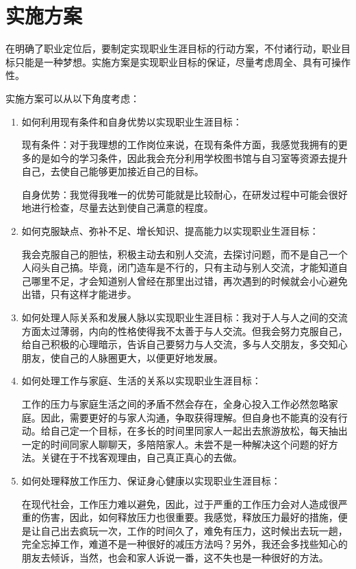 \documentclass{article}
\begin{document}
\section{实施方案}
在明确了职业定位后，要制定实现职业生涯目标的行动方案，不付诸行动，职业目标只能是一种梦想。实施方案是实现职业目标的保证，尽量考虑周全、具有可操作性。\par
实施方案可以从以下角度考虑：\par
\begin{enumerate}[1、]
	\item 如何利用现有条件和自身优势以实现职业生涯目标：\par 
	现有条件：对于我理想的工作岗位来说，在现有条件方面，我感觉我拥有的更多的是如今的学习条件，因此我会充分利用学校图书馆与自习室等资源去提升自己，去使自己能够更加接近自己的目标。\par 
	自身优势：我觉得我唯一的优势可能就是比较耐心，在研发过程中可能会很好地进行检查，尽量去达到使自己满意的程度。\par 
	\item 如何克服缺点、弥补不足、增长知识、提高能力以实现职业生涯目标：\par 
	我会克服自己的胆怯，积极主动去和别人交流，去探讨问题，而不是自己一个人闷头自己搞。毕竟，闭门造车是不行的，只有主动与别人交流，才能知道自己哪里不足，才会知道别人曾经在那里出过错，再次遇到的时候就会小心避免出错，只有这样才能进步。\par 
	\item 如何处理人际关系和发展人脉以实现职业生涯目标：我对于人与人之间的交流方面太过薄弱，内向的性格使得我不太善于与人交流。但我会努力克服自己，给自己积极的心理暗示，告诉自己要努力与人交流，多与人交朋友，多交知心朋友，使自己的人脉圈更大，以便更好地发展。\par 
	\item 如何处理工作与家庭、生活的关系以实现职业生涯目标：\par 
	工作的压力与家庭生活之间的矛盾不然会存在，全身心投入工作必然忽略家庭。因此，需要更好的与家人沟通，争取获得理解。但自身也不能真的没有行动。给自己定一个目标，在多长的时间里同家人一起出去旅游放松，每天抽出一定的时间同家人聊聊天，多陪陪家人。未尝不是一种解决这个问题的好方法。关键在于不找客观理由，自己真正真心的去做。\par 
	\item 如何处理释放工作压力、保证身心健康以实现职业生涯目标：\par 
	在现代社会，工作压力难以避免，因此，过于严重的工作压力会对人造成很严重的伤害，因此，如何释放压力也很重要。我感觉，释放压力最好的措施，便是让自己出去疯玩一次，工作的时间久了，难免有压力，这时候出去玩一趟，完全忘掉工作，难道不是一种很好的减压方法吗？另外，我还会多找些知心的朋友去倾诉，当然，也会和家人诉说一番，这不失也是一种很好的方法。
\end{enumerate}
\par 
\end{document}
